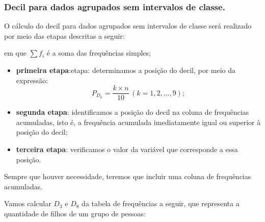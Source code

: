 \subsubsection{Decil para dados agrupados sem intervalos de classe.}

O cálculo do decil para dados agrupados sem intervalos de classe será realizado por meio das etapas descritas a seguir:

 em que \(\sum f_i\) é a soma das frequências simples;

\begin{itemize}
    \item \textbf{primeira etapa}:etapa: determinamos a posição do decil, por meio da expressão:
   \[
        P_{D_k}=\frac{k\times n}{10}\,(k=1,2,\dots, 9);
    \]
    \item \textbf{segunda etapa}: identificamos a posição do decil na coluna de frequências acumuladas, isto é, a frequência acumulada imediatamente igual ou superior à posição do decil;
    \item \textbf{terceira etapa}: verificamos o valor da variável que corresponde a essa posição.
\end{itemize}

Sempre que houver necessidade, teremos que incluir uma coluna de frequências acumuladas.

Vamos calcular \(D_3\) e  \(D_8\) da tabela de frequências a seguir, que representa a quantidade de filhos de um grupo de pessoas:

